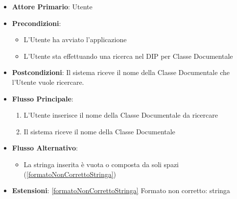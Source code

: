 \begin{itemize}
      \item \textbf{Attore Primario}: Utente
      \item \textbf{Precondizioni}:
      \begin{itemize}
            \item L'Utente ha avviato l'applicazione
            \item L'Utente sta effettuando una ricerca nel DIP per Classe Documentale
      \end{itemize}
      \item \textbf{Postcondizioni}: Il sistema riceve il nome della Classe Documentale che l'Utente vuole ricercare.
      \item \textbf{Flusso Principale}:
      \begin{enumerate}
            \item L'Utente inserisce il nome della Classe Documentale da ricercare
            \item Il sistema riceve il nome della Classe Documentale
      \end{enumerate}
      \item \textbf{Flusso Alternativo}: \begin{itemize}
            \item La stringa inserita è vuota o composta da soli spazi (\ref{formatoNonCorrettoStringa})
      \end{itemize}
      \item \textbf{Estensioni}: \ref{formatoNonCorrettoStringa} Formato non corretto: stringa
\end{itemize}


